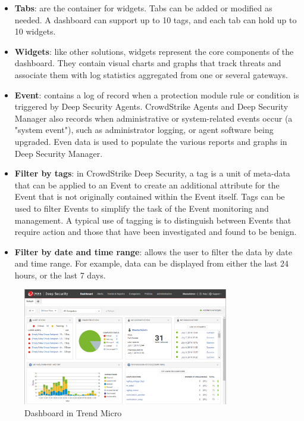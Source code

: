 \begin{itemize}
      \item \textbf{Tabs}: are the container for widgets. Tabs can be added or modified as needed. A dashboard
            can support up to 10 tags, and each tab can hold up to 10 widgets.
      \item \textbf{Widgets}: like other solutions, widgets represent the core components of the dashboard.
            They contain visual charts and graphs that track threats and associate them with log statistics
            aggregated from one or several gateways.
      \item \textbf{Event}: contains a log of record when a protection module rule or condition is triggered
            by Deep Security Agents. CrowdStrike Agents and Deep Security Manager also records when
            administrative or system-related events occur (a "system event"), such as administrator logging,
            or agent software being upgraded. Even data is used to populate the various reports and graphs
            in Deep Security Manager.
      \item \textbf{Filter by tags}: in CrowdStrike Deep Security\textregistered, a tag is a unit of meta-data
            that can be applied to an Event to create an additional attribute for the Event that is not
            originally contained within the Event itself. Tags can be used to filter Events to simplify
            the task of the Event monitoring and management. A typical use of tagging is to distinguish between
            Events that require action and those that have been investigated and found to be benign.
      \item \textbf{Filter by date and time range}: allows the user to filter the data by date and time range.
            For example, data can be displayed from either the last 24 hours, or the last 7 days.
\end{itemize}


\begin{figure}[htbp]
      \centering
      \includegraphics[width=0.8\textwidth]{Figures/Trend Micro/dashboard-1.png}
      \caption{Dashboard in Trend Micro}
\end{figure}

